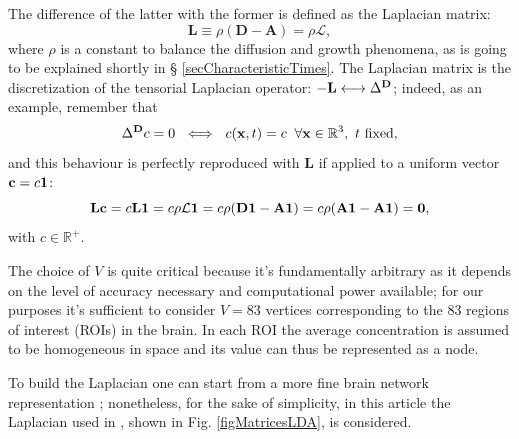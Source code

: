 \documentclass{article}
\begin{document}
                The difference of the latter with the former is defined as the Laplacian matrix:
                \begin{equation}
                    \mathbf L\equiv
                    \rho(\mathbf D-\mathbf A)=
                    \rho\boldsymbol{\mathcal L},
                    \label{eqLaplacianMatrix}
                \end{equation}
                where $\rho$ is a constant to balance the diffusion and growth phenomena, as is going to be explained shortly in § \ref{secCharacteristicTimes}. The Laplacian matrix is the discretization of the ten\-so\-rial Laplacian operator: $-\mathbf L\longleftrightarrow\Delta^{\mathbf D}$; indeed, as an example, remember that \[\Delta^{\mathbf D} c=0\ \iff\ c(\mathbf x,t)=c\;\;\forall\mathbf x\in\mathbb R^3,\ t\text{ fixed},\]and this behaviour is perfectly reproduced with $\mathbf L$ if applied to a uniform vector $\mathbf c=c\boldsymbol1$:
                \begin{equation*}
                    \mathbf L\mathbf c=
                    c\mathbf L\boldsymbol1=
                    c\rho\mathcal L\boldsymbol1=
                    c\rho(\mathbf D\boldsymbol1-\mathbf A\boldsymbol1)=
                    c\rho(\mathbf A\boldsymbol1-\mathbf A\boldsymbol1)=\boldsymbol0,
                \end{equation*}
                with $c\in\mathbb R^+$.

                The choice of $V$ is quite critical because it's fundamentally arbitrary as it depends on the level of accuracy necessary and computational power available; for our purposes it's sufficient to consider $V=83$ vertices corresponding to the 83 regions of interest (ROIs) in the brain. In each ROI the average concentration is assumed to be homogeneous in space and its value can thus be represented as a node.

                To build the Laplacian one can start from a more fine brain network representation \cite{BRCI,BRCII,BRCIII}; nonetheless, for the sake of simplicity, in this article the Laplacian used in \cite{Goriely2019,Goriely2019_L}, shown in Fig. \ref{figMatricesLDA}, is considered. %
\end{document}
